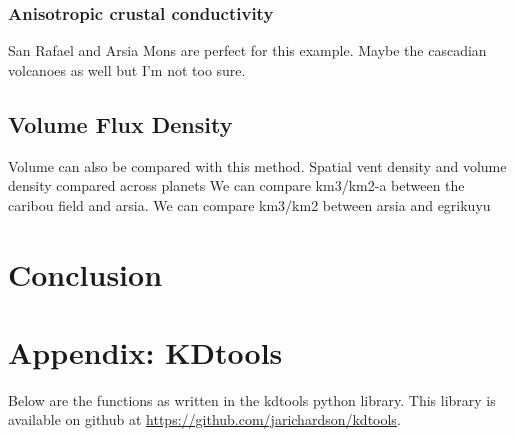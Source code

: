 \documentclass[12pt,letter]{article}
\begin{document}
\subsubsection{Anisotropic crustal conductivity}
San Rafael and Arsia Mons are perfect for this example. Maybe the cascadian volcanoes as well but I'm not too sure.


\subsection{Volume Flux Density}
Volume can also be compared with this method.
Spatial vent density and volume density compared across planets
We can compare km3/km2-a between the caribou field and arsia. We can compare km3/km2 between arsia and egrikuyu


\section{Conclusion}

\section{Appendix: KDtools}
\label{sec_kdtoolscode}
Below are the functions as written in the kdtools python library. This library is available on github at \url{https://github.com/jarichardson/kdtools}.
\end{document}
